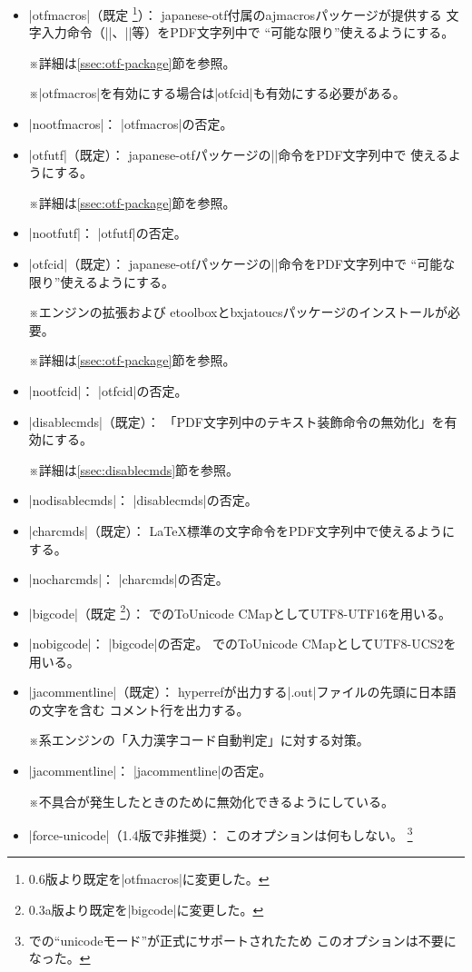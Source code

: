 \documentclass[uplatex,dvipdfmx,a4paper]{jsarticle}
\renewcommand{\headfont}{\gtfamily\romanseries{sbc}\sffamily}
\newcommand{\Pkg}[1]{\textsf{#1}}
\newcommand{\Note}{\par\noindent ※}
\newcommand{\Means}{：\quad}
\providecommand{\Strong}[1]{{\headfont#1}}
\begin{document}
\begin{itemize}
\item |otfmacros|（既定
  \footnote{0.6版より既定を|otfmacros|に変更した。}）\Means
  \Pkg{japanese-otf}付属の\Pkg{ajmacros}パッケージが提供する
  文字入力命令（|\ajMaru|、|\ajLig|等）をPDF文字列中で
  “可能な限り”使えるようにする。
  \Note 詳細は\ref{ssec:otf-package}節を参照。
  \Note |otfmacros|を有効にする場合は|otfcid|も有効にする必要がある。
\item |nootfmacros|\Means
  |otfmacros|の否定。
\item |otfutf|（既定）\Means
  \Pkg{japanese-otf}パッケージの|\UTF|命令をPDF文字列中で
  使えるようにする。
  \Note 詳細は\ref{ssec:otf-package}節を参照。
\item |nootfutf|\Means
  |otfutf|の否定。
\item |otfcid|（既定）\Means
  \Pkg{japanese-otf}パッケージの|\CID|命令をPDF文字列中で
  “可能な限り”使えるようにする。
  \Note エンジンの{\eTeX}拡張および
  \Pkg{etoolbox}と\Pkg{bxjatoucs}パッケージのインストールが必要。
  \Note 詳細は\ref{ssec:otf-package}節を参照。
\item |nootfcid|\Means
  |otfcid|の否定。
\item |disablecmds|（既定）\Means
  「PDF文字列中のテキスト装飾命令の無効化」を有効にする。
  \Note 詳細は\ref{ssec:disablecmds}節を参照。
\item |nodisablecmds|\Means
  |disablecmds|の否定。
\item |charcmds|（既定）\Means
  {\LaTeX}標準の文字命令をPDF文字列中で使えるようにする。
\item |nocharcmds|\Means
  |charcmds|の否定。
\item |bigcode|（既定
  \footnote{0.3a版より既定を|bigcode|に変更した。}）\Means
  {\upTeX}でのToUnicode CMapとしてUTF8-UTF16を用いる。
\item |nobigcode|\Means
  |bigcode|の否定。
  {\upTeX}でのToUnicode CMapとしてUTF8-UCS2を用いる。
\item |jacommentline|（既定）\Means
  \Pkg{hyperref}が出力する|.out|ファイルの先頭に日本語の文字を含む
  コメント行を出力する。
  \Note {\pTeX}系エンジンの「入力漢字コード自動判定」に対する対策。
\item |jacommentline|\Means
  |jacommentline|の否定。
  \Note 不具合が発生したときのために無効化できるようにしている。
\item |force-unicode|（1.4版で\Strong{非推奨}）\Means
  このオプションは何もしない。
  \footnote{{\pLaTeX}での“unicodeモード”が正式にサポートされたため
    このオプションは不要になった。}
\end{itemize}
\end{document}
